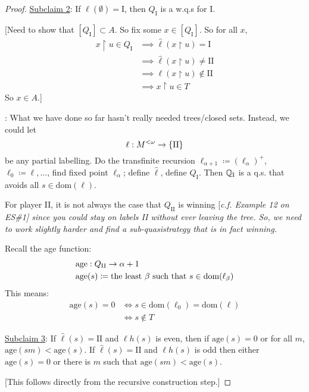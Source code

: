 \documentclass[]{article}
\newcommand{\I}{\textrm{I}}
\newcommand{\II}{\textrm{II}}
\newcommand{\lom}{{<\omega}}
\newcommand{\lh}{\ell h}
\begin{document}
\begin{proof}
    \underline{Subclaim 2}: If $\hat{\ell}(\emptyset) = \I$, then $Q_\I$ is a w.q.s for $\I$.

    [Need to show that $[Q_\I] \subset A$. So fix some $x \in [Q_\I]$. So for all $x$,
    \begin{align*}
        x\restriction u \in Q_\I &\implies \hat{\ell}(x\restriction u) = \I\\
        &\implies \hat{\ell}(x\restriction u)\ne \II\\
        &\implies \ell(x\restriction u)\not\in \II\\
        &\implies x\restriction u \in T
    \end{align*}
    So $x \in A$.]


\begin{remark*}: What we have done so far hasn't really needed trees/closed sets. Instead, we could let $$\ell :M^\lom \ra \{\II\}$$ be any partial labelling. Do the transfinite recursion $\ell_{\alpha+1} \coloneqq (\ell_\alpha)^+$, $\ell_0 \coloneqq \ell,\dots$, find fixed point $\ell_\alpha$; define $\hat{\ell}$, define $Q_\I$. Then $\Q_\I$ is a q.s. that avoids all $s \in \textrm{dom}(\ell)$.
\end{remark*}

For player II, it is not always the case that $Q_\II$ is winning [\it{c.f.} Example 12 on ES\#1] since you could stay on labels II without ever leaving the tree. So, we need to work slightly harder and find a sub-quasistrategy that is in fact winning.

Recall the age function:
\begin{align*}
    &\textrm{age}:Q_\II \ra \alpha + 1\\
    &\textrm{age}(s) \coloneqq \textrm{the least }\beta\textrm{ such that } s \in \textrm{dom}(\ell_{\beta})
\end{align*}
This means:
\begin{align*}
    \textrm{age}(s) =  0 &\iff s \in \textrm{dom}(\ell_0) = \textrm{dom}(\ell)\\
    &\iff s\not\in T
\end{align*}

\underline{Subclaim 3}: If $\hat{\ell}(s) = \II$ and $\lh(s)$ is even, then if $\textrm{age}(s) = 0$ or for all $m$, $\textrm{age}(sm) < \textrm{age}(s)$. If $\hat{\ell}(s) = \II$ and $\lh(s)$ is odd then either $\textrm{age}(s) = 0$ or there is $m$ such that $\textrm{age}(sm) < \textrm{age}(s)$.

[This follows directly from the recursive construction step.]


\end{proof}
\end{document}
